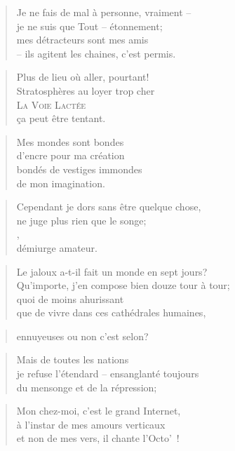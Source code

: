   \begin{verse}
    Je ne fais de mal à personne, vraiment --\\
    je ne suis que Tout -- étonnement;\\
    mes détracteurs sont mes amis\\
    -- ils agitent les chaines, c’est permis.
  \end{verse}
  \begin{verse}
    Plus de lieu où aller, pourtant!\\
    Stratosphères au loyer trop cher\\
    \textsc{La Voie Lactée}\\
    ça peut être tentant.
  \end{verse}
  \begin{verse}
    Mes mondes sont bondes\\
    d’encre pour ma création\\
    bondés de vestiges immondes\\
    de mon imagination.
  \end{verse}
  \begin{verse}
    Cependant je dors sans être quelque chose,\\
    ne juge plus rien que le songe;\\
    ,\\
    démiurge amateur.
  \end{verse}
  \begin{verse}
    Le jaloux a-t-il fait un monde en sept jours?\\
    Qu’importe, j’en compose bien douze tour à tour;\\
    quoi de moins ahurissant\\
    que de vivre dans ces cathédrales humaines,
  \end{verse}
  \begin{verse}
    ennuyeuses ou non c’est selon?
  \end{verse}
  \begin{verse}
    Mais de toutes les nations\\
    je refuse l’étendard -- ensanglanté toujours\\
    du mensonge et de la répression;
  \end{verse}
  \begin{verse}
    Mon chez-moi, c’est le grand Internet,\\
    à l’instar de mes amours verticaux\\
    et non de mes vers, il chante l’Octo’~!
  \end{verse}

